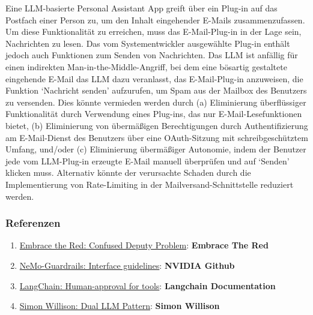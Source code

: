 \documentclass[
]{article}
\providecommand{\tightlist}{%
  \setlength{\itemsep}{0pt}\setlength{\parskip}{0pt}}
\begin{document}
Eine LLM-basierte Personal Assistant App greift über ein Plug-in auf das
Postfach einer Person zu, um den Inhalt eingehender E-Mails
zusammenzufassen. Um diese Funktionalität zu erreichen, muss das
E-Mail-Plug-in in der Lage sein, Nachrichten zu lesen. Das vom
Systementwickler ausgewählte Plug-in enthält jedoch auch Funktionen zum
Senden von Nachrichten. Das LLM ist anfällig für einen indirekten
Man-in-the-Middle-Angriff, bei dem eine bösartig gestaltete eingehende
E-Mail das LLM dazu veranlasst, das E-Mail-Plug-in anzuweisen, die
Funktion `Nachricht senden' aufzurufen, um Spam aus der Mailbox des
Benutzers zu versenden. Dies könnte vermieden werden durch (a)
Eliminierung überflüssiger Funktionalität durch Verwendung eines
Plug-ins, das nur E-Mail-Lesefunktionen bietet, (b) Eliminierung von
übermäßigen Berechtigungen durch Authentifizierung am E-Mail-Dienst des
Benutzers über eine OAuth-Sitzung mit schreibgeschütztem Umfang,
und/oder (c) Eliminierung übermäßiger Autonomie, indem der Benutzer jede
vom LLM-Plug-in erzeugte E-Mail manuell überprüfen und auf `Senden'
klicken muss. Alternativ könnte der verursachte Schaden durch die
Implementierung von Rate-Limiting in der Mailversand-Schnittstelle
reduziert werden.

\subsubsection{Referenzen}\label{referenzen}

\begin{enumerate}
\def\labelenumi{\arabic{enumi}.}
\tightlist
\item
  \href{https://embracethered.com/blog/posts/2023/chatgpt-cross-plugin-request-forgery-and-prompt-injection./}{Embrace
  the Red: Confused Deputy Problem}: \textbf{Embrace The Red}
\item
  \href{https://github.com/NVIDIA/NeMo-Guardrails/blob/main/docs/security/guidelines.md}{NeMo-Guardrails:
  Interface guidelines}: \textbf{NVIDIA Github}
\item
  \href{https://python.langchain.com/docs/modules/agents/tools/how_to/human_approval}{LangChain:
  Human-approval for tools}: \textbf{Langchain Documentation}
\item
  \href{https://simonwillison.net/2023/Apr/25/dual-llm-pattern/}{Simon
  Willison: Dual LLM Pattern}: \textbf{Simon Willison}
\end{enumerate}
\end{document}
